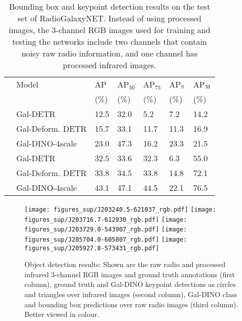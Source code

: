 \documentclass[
  journal=pasa,
  manuscript=research-paper, %
  year=2020,
  volume=37,
]{cup-journal}
\begin{document}
\begin{table}
    \centering
    \caption{Bounding box and keypoint detection results on the test set of RadioGalaxyNET. Instead of using processed images, the 3-channel RGB images used for training and testing the networks include two channels that contain noisy raw radio information, and one channel has processed infrared images.}
    \begin{NiceTabular}{lllllll}
    \toprule
    &  Model        & AP  & AP$_{50}$ & AP$_{75}$  & AP$_{\rm S}$ & AP$_{\rm M}$  \\
    &                       & (\%)  & (\%)  & (\%)  & (\%) & (\%)  \\
    \midrule
    & Gal-DETR               & 12.5  & 32.0  & 5.2   &  7.2   &  14.2  \\
    & Gal-Deform. DETR     & 15.7  & 33.1  & 11.7  & 11.3  &  16.9  \\
    & Gal-DINO-4scale           & 23.0  & 47.3  & 16.2  & 23.3  &  21.5 \\
    \midrule
    & Gal-DETR                 & 32.5  & 33.6  & 32.3  &  6.3   &  55.0 \\
    & Gal-Deform. DETR     & 33.8  & 34.5  & 33.8  & 14.8  &  72.1  \\
    & Gal-DINO-4scale         & 43.1  & 47.1  & 44.5  & 22.1  &  76.5  \\
    \bottomrule
    \end{NiceTabular}
    \label{TAB:AP1_sup}
\end{table}

\begin{figure*}
\centering
\texttt{[image: figures\_sup/J203240.5-621037\_rgb.pdf]}
\texttt{[image: figures\_sup/J203716.7-612930\_rgb.pdf]}
\texttt{[image: figures\_sup/J203729.0-543907\_rgb.pdf]}
\texttt{[image: figures\_sup/J205704.0-605807\_rgb.pdf]}
\texttt{[image: figures\_sup/J205927.8-573431\_rgb.pdf]}
\caption{Object detection results: Shown are the raw radio and processed infrared 3-channel RGB images and ground truth annotations (first column), ground truth and Gal-DINO keypoint detections as circles and triangles over infrared images (second column), Gal-DINO class and bounding box predictions over raw radio images (third column). Better viewed in colour.} 
\label{FIG:Results_sup}
\end{figure*}
\end{document}
